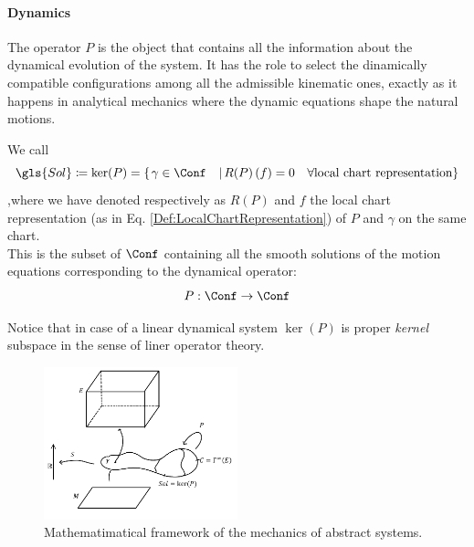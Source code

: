 \documentclass[Main]{subfiles}
\begin{document}
	\paragraph{Dynamics}
	The operator $P$ is the object that contains all the information about the dynamical evolution of the system.
	It has the role to select the dinamically compatible configurations among all the admissible kinematic ones, exactly as it happens in analytical mechanics where the dynamic equations shape the natural motions.
	\begin{definition}\label{Def:SolSpace}
		We call
		\begin{displaymath}
			\gls{Sol} \coloneqq \ker(P) = \left\{\left. \gamma \in \Conf \quad\right\vert  R(P)\left(f\right) = 0 \quad \forall \textrm{local chart representation}\right\}
		\end{displaymath}
		,where we have denoted respectively as $R(P)$ and $f$ the local chart representation (as in Eq. \ref{Def:LocalChartRepresentation}) of $P$ and $\gamma$ on the same chart.\\
		This is the subset of $\Conf$ containing all the smooth solutions of the motion equations corresponding to the  dynamical operator:	
		\begin{displaymath}
			P: \Conf \rightarrow \Conf
		\end{displaymath}
	\end{definition}
	Notice that in case of a linear dynamical system $\ker(P)$ is proper \emph{kernel} subspace in the sense of liner operator theory.
	
	\begin{figure}[h!]
		\centering
		\includegraphics[width=0.5\textwidth]{Pictures/AbstractFieldTheory} 
		 	 	\caption{Mathematimatical framework of the mechanics of abstract systems. }
	\end{figure}	
	
\end{document}
